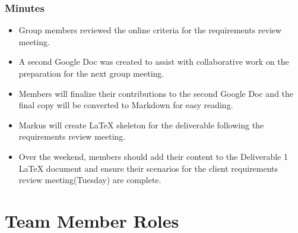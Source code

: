 \documentclass{article}
\begin{document}
\subsubsection{Minutes}
\begin{itemize}
\item Group members reviewed the online criteria for the requirements review meeting.
\item A second Google Doc was created to assist with collaborative work on the preparation for the next group meeting.
\item Members will finalize their contributions to the second Google Doc and the final copy will be converted to Markdown for easy reading.
\item Markus will create LaTeX skeleton for the deliverable following the requirements review meeting.
\item Over the weekend, members should add their content to the Deliverable 1 LaTeX document and ensure their scenarios for the client requirements review meeting(Tuesday) are complete.
\end{itemize}


\section{Team Member Roles}


\end{document}
